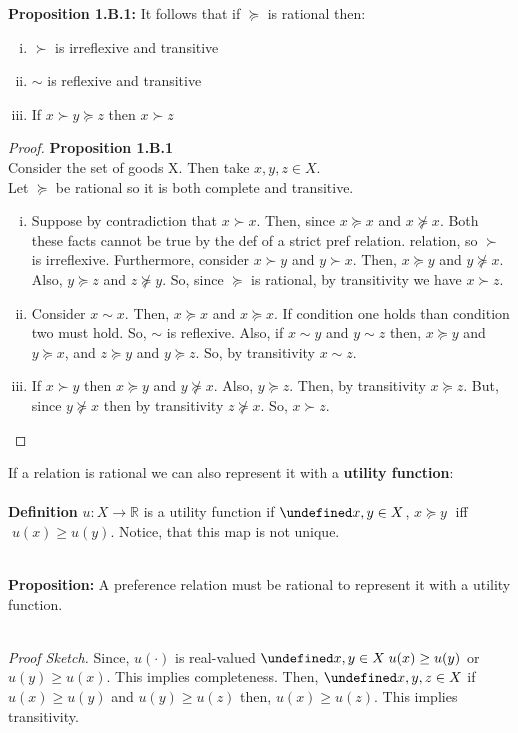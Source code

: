 \documentclass[12pt]{article}
\newcommand{\R}{\mathbb{R}}
\let\oldforall\forall
\let\forall\undefined
\DeclareMathOperator{\forall}{\,\oldforall\,}
\begin{document}
\textbf{Proposition 1.B.1:} It follows that if $\succeq$ is rational then:
\begin{enumerate}[i.]
\item $\succ$ is irreflexive and transitive
\item $\sim$ is reflexive and transitive
\item If $x \succ y \succeq z$ then $x \succ z$
\end{enumerate}


\begin{proof} \textbf{Proposition 1.B.1}
\\Consider the set of goods X. Then take $x,y,z \in X$. 
\\Let $\succeq$ be rational so it is both complete and transitive.
\begin{enumerate}[i.]
\item Suppose by contradiction that $x \succ x$. Then, since $x \succeq x$ and $x \not\succeq x$. Both these facts cannot be true by the def of a strict pref relation. relation, so $\succ$ is irreflexive. Furthermore, consider $x \succ y$ and $y \succ x$. Then, $ x \succeq y$ and $y \not\succeq x$. Also, $ y \succeq z$ and $z \not\succeq y$. So, since $\succeq$ is rational, by transitivity we have $x \succ z$.
\item Consider $x \sim x$. Then,  $x \succeq x$ and $x \succeq x$. If condition one holds than condition two must hold. So, $\sim$ is reflexive. Also, if $x \sim y$ and $y \sim z$ then, $x \succeq y$ and $y \succeq x$, and $z \succeq y$ and $y \succeq z$. So, by transitivity $x \sim z$.
\item If $x \succ y $ then $x \succeq y$ and $y \not\succeq x$. Also, $y \succeq z$. Then, by transitivity $x \succeq z$. But, since $y \not\succeq x$ then by transitivity $z \not\succeq x$. So, $x \succ z$.
\end{enumerate}
\end{proof}
\noindent
If a relation is rational we can also represent it with a \textbf{utility function}:
\\\textbf{\\Definition} $u: X \rightarrow \R$ is a utility function if $\forall x,y \in X$, $x\succeq y \; $ iff $ \; u(x) \geq u(y)$.
Notice, that this map is not unique.

\textbf{\\Proposition:} A preference relation must be rational to represent it with a utility function.

\emph{\\Proof Sketch.} Since, $u(\cdot)$ is real-valued $\forall x,y \in X \; u(x) \geq u(y)$ or $u(y) \geq u(x)$. This implies completeness. Then, $\forall x,y,z \in X$ if $u(x) \geq u(y)$ and $u(y) \geq u(z)$ then, $u(x) \geq u(z)$. This implies transitivity. 
\end{document}
